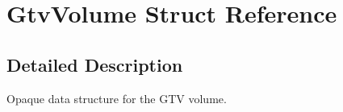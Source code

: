 \section{Gtv\+Volume Struct Reference}
\label{structGtvVolume}


\subsection{Detailed Description}
Opaque data structure for the G\+T\+V volume. 
